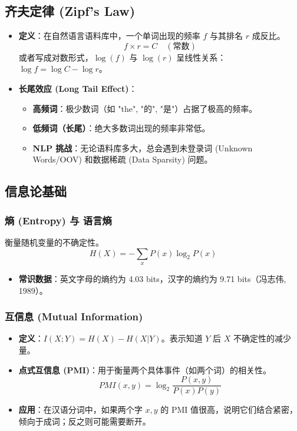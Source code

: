 \documentclass[a4paper, 11pt]{ctexart}
\begin{document}
\subsection{齐夫定律 (Zipf's Law)}
\begin{itemize}
    \item \textbf{定义}：在自然语言语料库中，一个单词出现的频率 $f$ 与其排名 $r$ 成反比。
    $$ f \times r = C \quad (\text{常数}) $$
    或者写成对数形式，$\log(f)$ 与 $\log(r)$ 呈线性关系：$\log f = \log C - \log r$。
    
    \item \textbf{长尾效应 (Long Tail Effect)}：
    \begin{itemize}
        \item \textbf{高频词}：极少数词（如 "the", "的", "是"）占据了极高的频率。
        \item \textbf{低频词（长尾）}：绝大多数词出现的频率非常低。
        \item \textbf{NLP 挑战}：无论语料库多大，总会遇到未登录词 (Unknown Words/OOV) 和数据稀疏 (Data Sparsity) 问题。
    \end{itemize}
\end{itemize}

\subsection{信息论基础}

\subsubsection{熵 (Entropy) 与 语言熵}
衡量随机变量的不确定性。
$$ H(X) = - \sum_{x} P(x) \log_2 P(x) $$
\begin{itemize}
    \item \textbf{常识数据}：英文字母的熵约为 4.03 bits，汉字的熵约为 9.71 bits（冯志伟, 1989）。
\end{itemize}

\subsubsection{互信息 (Mutual Information)}
\begin{itemize}
    \item \textbf{定义}：$I(X; Y) = H(X) - H(X|Y)$。表示知道 $Y$ 后 $X$ 不确定性的减少量。
    \item \textbf{点式互信息 (PMI)}：用于衡量两个具体事件（如两个词）的相关性。
    $$ PMI(x, y) = \log_2 \frac{P(x, y)}{P(x)P(y)} $$
    \item \textbf{应用}：在汉语分词中，如果两个字 $x, y$ 的 PMI 值很高，说明它们结合紧密，倾向于成词；反之则可能需要断开。
\end{itemize}
\end{document}
